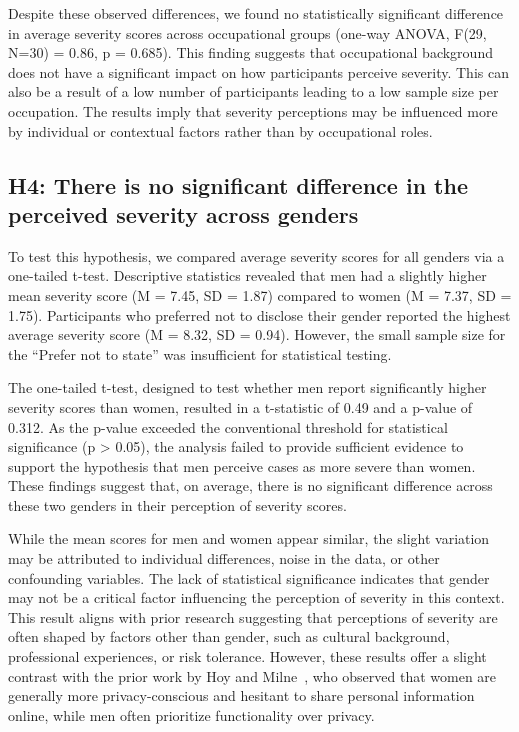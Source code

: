 Despite these observed differences, we found no statistically significant difference in average severity scores across occupational groups (one-way ANOVA, F(29, N=30) = 0.86, p = 0.685).
This finding suggests that occupational background does not have a significant impact on how participants perceive severity.
This can also be a result of a low number of participants leading to a low sample size per occupation.
The results imply that severity perceptions may be influenced more by individual or contextual factors rather than by occupational roles.

\subsection{H4: There is no significant difference in the perceived severity across genders}

To test this hypothesis, we compared average severity scores for all genders via a one-tailed t-test.
Descriptive statistics revealed that men had a slightly higher mean severity score (M = 7.45, SD = 1.87) compared to women (M = 7.37, SD = 1.75).
Participants who preferred not to disclose their gender reported the highest average severity score (M = 8.32, SD = 0.94).
However, the small sample size for the ``Prefer not to state'' was insufficient for statistical testing.

The one-tailed t-test, designed to test whether men report significantly higher severity scores than women, resulted in a t-statistic of 0.49 and a p-value of 0.312.
As the p-value exceeded the conventional threshold for statistical significance (p > 0.05), the analysis failed to provide sufficient evidence to support the hypothesis that men perceive cases as more severe than women.
These findings suggest that, on average, there is no significant difference across these two genders in their perception of severity scores.

While the mean scores for men and women appear similar, the slight variation may be attributed to individual differences, noise in the data, or other confounding variables.
The lack of statistical significance indicates that gender may not be a critical factor influencing the perception of severity in this context.
This result aligns with prior research suggesting that perceptions of severity are often shaped by factors other than gender, such as cultural background, professional experiences, or risk tolerance.
However, these results offer a slight contrast with the prior work by Hoy and Milne~\cite{hoy2010gender}, who observed that women are generally more privacy-conscious and hesitant to share personal information online, while men often prioritize functionality over privacy.

